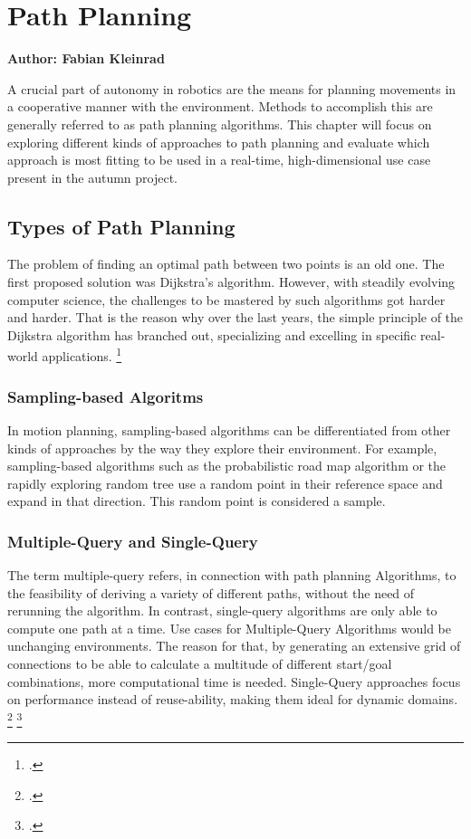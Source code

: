 \chapter{Path Planning}
\label{chapter:path_planning}

\textbf{Author: Fabian Kleinrad} 

A crucial part of autonomy in robotics are the means for planning movements in a cooperative manner with the environment. Methods to accomplish this are generally referred to as path planning algorithms. This chapter will focus on exploring different kinds of approaches to path planning and evaluate which approach is most fitting to be used in a real-time, high-dimensional use case present in the autumn project.


\section{Types of Path Planning}

The problem of finding an optimal path between two points is an old one.
The first proposed solution was Dijkstra's algorithm. However, with steadily evolving computer science, the challenges to be mastered by such algorithms got harder and harder. That is the reason why over the last years, the simple principle of the Dijkstra algorithm has branched out, specializing and excelling in specific real-world applications.
\footcite{Pan2020}

\subsection{Sampling-based Algoritms}

In motion planning, sampling-based algorithms can be differentiated from other kinds of approaches by the way they explore their environment. For example, sampling-based algorithms such as the probabilistic road map algorithm or the rapidly exploring random tree use a random point in their reference space and expand in that direction. This random point is considered a sample.

\subsection{Multiple-Query and Single-Query}

The term multiple-query refers, in connection with path planning Algorithms, to the feasibility of deriving a variety of different paths, without the need of rerunning the algorithm. In contrast, single-query algorithms are only able to compute one path at a time.\newline
Use cases for Multiple-Query Algorithms would be unchanging environments. The reason for that, by generating an extensive grid of connections to be able to calculate a multitude of different start/goal combinations, more computational time is needed.\newline
Single-Query approaches focus on performance instead of reuse-ability, making them ideal for dynamic domains. 
\footcite{Bekris2003}
\footcite{stackexchangeMultiSingleQuery2019}

